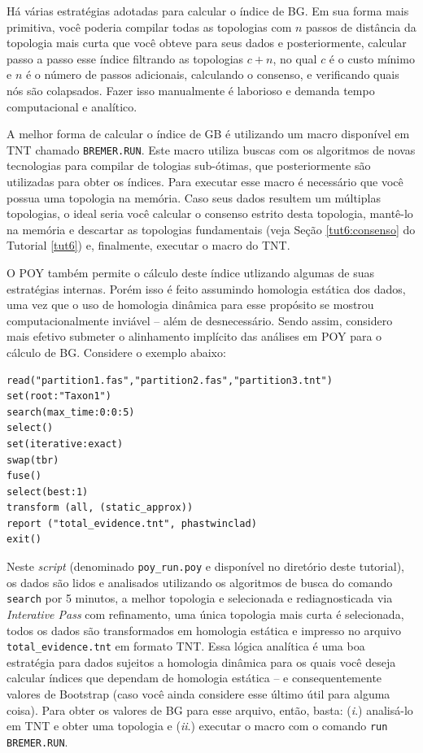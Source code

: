 \begin{refsection}
Há várias estratégias adotadas para calcular o índice de BG. Em sua forma mais primitiva, você poderia compilar todas as topologias com $n$ passos de distância da topologia mais curta que você obteve para seus dados e posteriormente, calcular passo a passo esse índice filtrando as topologias $c+n$, no qual $c$ é o custo mínimo e $n$ é o número de passos adicionais, calculando o consenso, e verificando quais nós são colapsados. Fazer isso manualmente é laborioso e demanda tempo computacional e analítico.

A melhor forma de calcular o índice de GB é utilizando um macro disponível em TNT chamado \texttt{BREMER.RUN}. Este macro utiliza buscas com os algoritmos de novas tecnologias para compilar de tologias sub-ótimas, que posteriormente são utilizadas para obter os índices. Para executar esse macro é necessário que você possua uma topologia na memória. Caso seus dados resultem um múltiplas topologias, o ideal seria você calcular o consenso estrito desta topologia, mantê-lo na memória e descartar as topologias fundamentais (veja Seção \ref{tut6:consenso} do Tutorial \ref{tut6}) e, finalmente, executar o macro do TNT.

O POY também permite o cálculo deste índice utlizando algumas de suas estratégias internas. Porém isso é feito assumindo homologia estática dos dados, uma vez que o uso de homologia dinâmica para esse propósito se mostrou computacionalmente inviável -- além de desnecessário. Sendo assim, considero mais efetivo submeter o alinhamento implícito das análises em POY para o cálculo de BG. Considere o exemplo abaixo:\\

\begin{lstlisting}[label=tut14:bs]
read("partition1.fas","partition2.fas","partition3.tnt")
set(root:"Taxon1")
search(max_time:0:0:5)
select()
set(iterative:exact)
swap(tbr)
fuse()
select(best:1)
transform (all, (static_approx))
report ("total_evidence.tnt", phastwinclad)
exit()
\end{lstlisting}

\vspace{35pt}

Neste \textit{script} (denominado \texttt{poy\_run.poy} e disponível no diretório deste tutorial), os dados são lidos e analisados utilizando os algoritmos de busca do comando \texttt{search} por 5 minutos, a melhor topologia e selecionada e rediagnosticada via \textit{Interative Pass} com refinamento, uma única topologia mais curta é selecionada, todos os dados são transformados em homologia estática e impresso no arquivo \texttt{total\_evidence.tnt} em formato TNT. Essa lógica analítica é uma boa estratégia para dados sujeitos a homologia dinâmica para os quais você deseja calcular índices que dependam de homologia estática -- e consequentemente valores de Bootstrap (caso você ainda considere esse último útil para alguma coisa). Para obter os valores de BG para esse arquivo, então, basta: (\textit{i}.) analisá-lo em TNT e obter uma topologia e (\textit{ii}.) executar o macro com o comando \texttt{run BREMER.RUN}.\\


\end{refsection}
